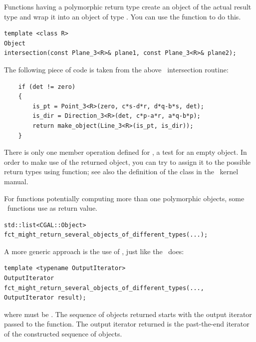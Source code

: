 Functions having a polymorphic return type create an object of the actual
result type and wrap it into an object of type .
You can use the 
function to do this. 
\begin{verbatim}
template <class R>
Object
intersection(const Plane_3<R>& plane1, const Plane_3<R>& plane2);
\end{verbatim}
The following piece of code is taken from the above \cgal\ intersection routine:
\begin{verbatim}
    if (det != zero) 
    {
        is_pt = Point_3<R>(zero, c*s-d*r, d*q-b*s, det);
        is_dir = Direction_3<R>(det, c*p-a*r, a*q-b*p);
        return make_object(Line_3<R>(is_pt, is_dir));
    }
\end{verbatim}

There is only one member operation defined for , a test for
an empty object. In order to make use of the returned object, 
you can try to assign it to the possible return types using 
function; see also the definition of the class 
 in the 
\cgal\ kernel manual. 

For functions potentially computing more than one polymorphic objects, some 
\cgal\ functions use  as return value. 
\begin{verbatim}
std::list<CGAL::Object>
fct_might_return_several_objects_of_different_types(...);
\end{verbatim}

A more generic approach is the use of , just like
the \stl\ does:
\begin{verbatim}
template <typename OutputIterator>
OutputIterator
fct_might_return_several_objects_of_different_types(..., OutputIterator result);
\end{verbatim}
where  must be .
The sequence of objects returned starts with the output iterator passed to
the function. The output iterator returned is the past-the-end iterator of 
the constructed sequence of objects. 


